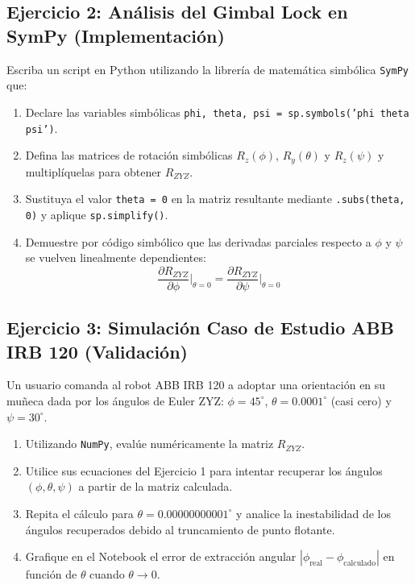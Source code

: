 \documentclass[11pt, a4paper]{article}
\begin{document}
\subsection*{Ejercicio 2: Análisis del Gimbal Lock en SymPy (Implementación)}
Escriba un script en Python utilizando la librería de matemática simbólica \texttt{SymPy} que:
\begin{enumerate}
    \item Declare las variables simbólicas \texttt{phi, theta, psi = sp.symbols('phi theta psi')}.
    \item Defina las matrices de rotación simbólicas $R_z(\phi)$, $R_y(\theta)$ y $R_z(\psi)$ y multiplíquelas para obtener $R_{ZYZ}$.
    \item Sustituya el valor \texttt{theta = 0} en la matriz resultante mediante \texttt{.subs(theta, 0)} y aplique \texttt{sp.simplify()}.
    \item Demuestre por código simbólico que las derivadas parciales respecto a $\phi$ y $\psi$ se vuelven linealmente dependientes:
    $$ \frac{\partial R_{ZYZ}}{\partial \phi}\Bigg\vert_{\theta=0} = \frac{\partial R_{ZYZ}}{\partial \psi}\Bigg\vert_{\theta=0} $$
\end{enumerate}

\subsection*{Ejercicio 3: Simulación Caso de Estudio ABB IRB 120 (Validación)}
Un usuario comanda al robot ABB IRB 120 a adoptar una orientación en su muñeca dada por los ángulos de Euler ZYZ: $\phi = 45^\circ$, $\theta = 0.0001^\circ$ (casi cero) y $\psi = 30^\circ$.
\begin{enumerate}
    \item Utilizando \texttt{NumPy}, evalúe numéricamente la matriz $R_{ZYZ}$.
    \item Utilice sus ecuaciones del Ejercicio 1 para intentar recuperar los ángulos $(\phi, \theta, \psi)$ a partir de la matriz calculada.
    \item Repita el cálculo para $\theta = 0.00000000001^\circ$ y analice la inestabilidad de los ángulos recuperados debido al truncamiento de punto flotante.
    \item Grafique en el Notebook el error de extracción angular $| \phi_{\text{real}} - \phi_{\text{calculado}} |$ en función de $\theta$ cuando $\theta \to 0$.
\end{enumerate}
\end{document}
